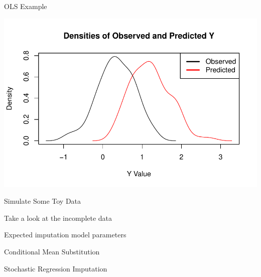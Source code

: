 \documentclass[table]{beamer}
\begin{document}
\begin{frame}[allowframebreaks]{OLS Example}
    

 
\pagebreak


\includegraphics{sweaveFiles/lecture2-004}

\end{frame}


\begin{frame}{Simulate Some Toy Data}
  


\end{frame}


\begin{frame}{Take a look at the incomplete data}



\end{frame}


\begin{frame}{Expected imputation model parameters}
    


\end{frame}


\begin{frame}{Conditional Mean Substitution}



\end{frame}


\begin{frame}{Stochastic Regression Imputation}
    


\end{frame}
\end{document}
